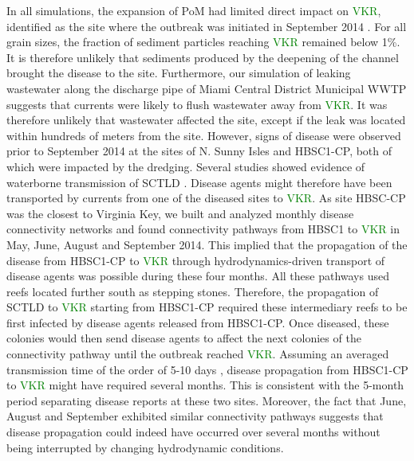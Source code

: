 \documentclass[preprint,12pt,authoryear]{elsarticle}
\newcommand{\modif}[1]{\textcolor{green}{#1}}
\begin{document}
In all simulations, the expansion of PoM had limited direct impact on \modif{VKR}, identified as the site where the outbreak was initiated in September 2014 \citep{precht2016unprecedented}. For all grain sizes, the fraction of sediment particles reaching \modif{VKR} remained below 1\%. It is therefore unlikely that sediments produced by the deepening of the channel brought the disease to the site. Furthermore, our simulation of leaking wastewater along the discharge pipe of Miami Central District Municipal WWTP suggests that currents were likely to flush wastewater away from \modif{VKR}. It was therefore unlikely that wastewater affected the site, except if the leak was located within hundreds of meters from the site. However, signs of disease were observed prior to September 2014 at the sites of N. Sunny Isles and HBSC1-CP, both of which were impacted by the dredging. Several studies showed evidence of waterborne transmission of SCTLD \citep{aeby2019pathogenesis,dobbelaere2020coupled,eaton2021measuring,meiling2021variable}. Disease agents might therefore have been transported by currents from one of the diseased sites to \modif{VKR}. As site HBSC-CP was the closest to Virginia Key, we built and analyzed monthly disease connectivity networks and found connectivity pathways from HBSC1 to \modif{VKR} in May, June, August and September 2014. This implied that the propagation of the disease from HBSC1-CP to \modif{VKR} through hydrodynamics-driven transport of disease agents was possible during these four months. All these pathways used reefs located further south as stepping stones. Therefore, the propagation of SCTLD to \modif{VKR} starting from HBSC1-CP required these intermediary reefs to be first infected by disease agents released from HBSC1-CP. Once diseased, these colonies would then send disease agents to affect the next colonies of the connectivity pathway until the outbreak reached \modif{VKR}. Assuming an averaged transmission time of the order of 5-10 days \citep{dobbelaere2020coupled}, disease propagation from HBSC1-CP to \modif{VKR} might have required several months. This is consistent with the 5-month period separating disease reports at these two sites. Moreover, the fact that June, August and September exhibited similar connectivity pathways suggests that disease propagation could indeed have occurred over several months without being interrupted by changing hydrodynamic conditions.
\end{document}
